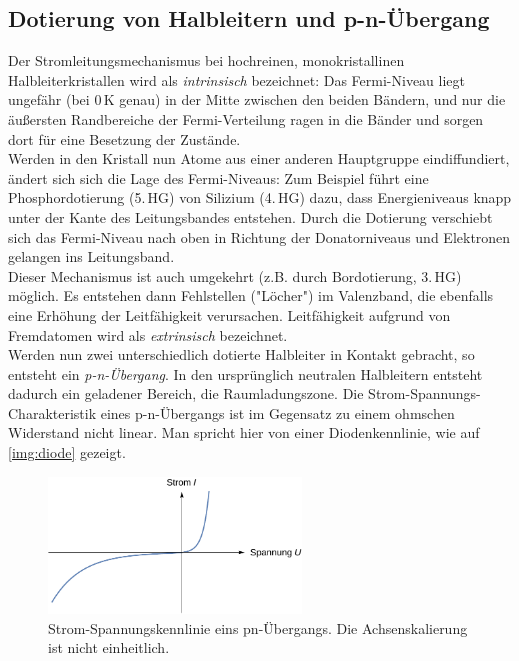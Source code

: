 \subsection{Dotierung von Halbleitern und p-n-Übergang}

Der Stromleitungsmechanismus bei hochreinen, monokristallinen Halbleiterkristallen \linebreak
wird als \emph{intrinsisch} bezeichnet:
Das Fermi-Niveau liegt ungefähr (bei 0\,K genau) in der Mitte zwischen den beiden Bändern,
und nur die äußersten Randbereiche der Fermi-Verteilung ragen in die Bänder
und sorgen dort für eine Besetzung der Zustände.\\
Werden in den Kristall nun Atome aus einer anderen Hauptgruppe eindiffundiert,
ändert sich sich die Lage des Fermi-Niveaus:
Zum Beispiel führt eine Phosphordotierung (5.\,HG) von Silizium (4.\,HG) dazu,
dass Energieniveaus knapp unter der Kante des Leitungsbandes entstehen.
Durch die Dotierung verschiebt sich das Fermi-Niveau nach oben in Richtung der Donatorniveaus und
Elektronen gelangen ins Leitungsband.\\
Dieser Mechanismus ist auch umgekehrt (z.B. durch Bordotierung, 3.\,HG) möglich.
Es entstehen dann Fehlstellen ("Löcher") im Valenzband,
die ebenfalls eine Erhöhung der Leitfähigkeit verursachen.
Leitfähigkeit aufgrund von Fremdatomen wird als \emph{extrinsisch} bezeichnet.\\[0.15cm]
Werden nun zwei unterschiedlich dotierte Halbleiter in Kontakt gebracht,
so entsteht ein \emph{p-n-Übergang}.
In den ursprünglich neutralen Halbleitern entsteht dadurch ein geladener Bereich, die Raumladungszone.
Die Strom-Spannungs-Charakteristik eines p-n-Übergangs ist im Gegensatz zu einem ohmschen Widerstand
nicht linear. Man spricht hier von einer Diodenkennlinie, wie auf \autoref{img:diode} gezeigt.
\begin{figure}[H]
\begin{center}
  \includegraphics[width=0.6\textwidth]{../img/diode.pdf}
  \caption{Strom-Spannungskennlinie eins pn-Übergangs.
  Die Achsenskalierung ist nicht einheitlich.}
  \label{img:diode}
\end{center}
\end{figure}
